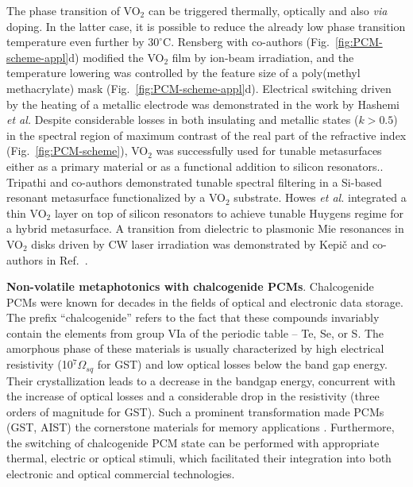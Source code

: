 \documentclass[journal=chreay,manuscript=review]{achemso}
\begin{document}
The phase transition of VO$_2$ can be triggered thermally, optically and also \textit{via} doping. In the latter case, it is possible to reduce the already low phase transition temperature even further by $30^\circ$C. Rensberg with co-authors\cite{rensberg2016active} (Fig.~\ref{fig:PCM-scheme-appl}d) modified the VO$_2$ film by ion-beam irradiation, and the temperature lowering was controlled by the feature size of a poly(methyl methacrylate) mask (Fig.~\ref{fig:PCM-scheme-appl}d). Electrical switching driven by the heating of a metallic electrode was demonstrated in the work by Hashemi \textit{et al.} \cite{hashemi2016electronically}
Despite considerable losses in both insulating and metallic states ($k>0.5$) in the spectral region of maximum contrast of the real part of the refractive index (Fig.~\ref{fig:PCM-scheme}), VO$_2$ was successfully used for tunable metasurfaces either as a primary material \cite{kepic2021optically} or as a functional addition to silicon resonators.\cite{howes2020optical,tripathi2021tunable}. Tripathi and co-authors\cite{tripathi2021tunable} demonstrated tunable spectral filtering in a Si-based resonant metasurface functionalized by a VO$_2$ substrate. Howes \textit{et al.} integrated a thin VO$_2$ layer on top of silicon resonators to achieve tunable Huygens regime for a hybrid metasurface\cite{howes2020optical}. A transition from dielectric to plasmonic Mie resonances in VO$_2$ disks driven by CW laser irradiation was demonstrated by Kepi\v{c} and co-authors in Ref.~.

{\bf Non-volatile metaphotonics with chalcogenide PCMs}. Chalcogenide PCMs were known for decades in the fields of optical and electronic data storage. The prefix ``chalcogenide'' refers to the fact that these compounds invariably contain the elements from group VIa of the periodic table – Te, Se, or S. The amorphous phase of these materials is usually characterized by high electrical resistivity (10$^7\Omega_{sq}$ for GST) and low optical losses below the band gap energy. Their crystallization leads to a decrease in the bandgap energy, concurrent with the increase of optical losses and a considerable drop in the resistivity (three orders of magnitude for GST\cite{friedrich2000structural}). Such a prominent transformation made PCMs (GST, AIST) the cornerstone materials for memory applications \cite{wuttig2007phase,driscoll2009memory}. Furthermore, the switching of chalcogenide PCM state can be performed with appropriate thermal, electric or optical stimuli, which facilitated their integration  into both electronic and optical commercial technologies.
\end{document}

